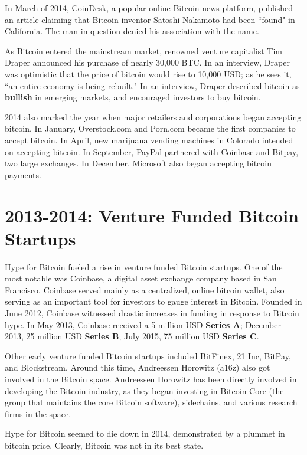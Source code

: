\documentclass[full.tex]{subfiles}
\begin{document}
    In March of 2014, CoinDesk, a popular online Bitcoin news platform, published an article claiming that Bitcoin inventor Satoshi Nakamoto had been ``found" in California. The man in question denied his association with the name.
    
    As Bitcoin entered the mainstream market, renowned venture capitalist Tim Draper announced his purchase of nearly 30,000 BTC. In an interview, Draper was optimistic that the price of bitcoin would rise to 10,000 USD; as he sees it, ``an entire economy is being rebuilt." In an interview, Draper described bitcoin as \textbf{bullish} in emerging markets, and encouraged investors to buy bitcoin.
    
    2014 also marked the year when major retailers and corporations began accepting bitcoin. In January, Overstock.com and Porn.com became the first companies to accept bitcoin. In April, new marijuana vending machines in Colorado intended on accepting bitcoin. In September, PayPal partnered with Coinbase and Bitpay, two large exchanges. In December, Microsoft also began accepting bitcoin payments.
    \section*{2013-2014: Venture Funded Bitcoin Startups} 
    
    Hype for Bitcoin fueled a rise in venture funded Bitcoin startups. One of the most notable was Coinbase, a digital asset exchange company based in San Francisco. Coinbase served mainly as a centralized, online bitcoin wallet, also serving as an important tool for investors to gauge interest in Bitcoin. Founded in June 2012, Coinbase witnessed drastic increases in funding in response to Bitcoin hype. In May 2013, Coinbase received a 5 million USD \textbf{Series A}; December 2013, 25 million USD \textbf{Series B}; July 2015, 75 million USD \textbf{Series C}.
    
    Other early venture funded Bitcoin startups included BitFinex, 21 Inc, BitPay, and Blockstream. Around this time, Andreessen Horowitz (a16z) also got involved in the Bitcoin space. Andreessen Horowitz has been directly involved in developing the Bitcoin industry, as they began investing in Bitcoin Core (the group that maintains the core Bitcoin software), sidechains, and various research firms in the space.
    
    Hype for Bitcoin seemed to die down in 2014, demonstrated by a plummet in bitcoin price. Clearly, Bitcoin was not in its best state.
    
\end{document}
